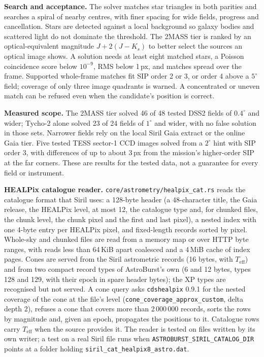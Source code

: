 \documentclass[11pt,a4paper]{article}
\newcommand{\code}[1]{\texttt{\small #1}}
\newcommand{\crate}[1]{\texttt{#1}}
\begin{document}
    \textbf{Search and acceptance.} The solver matches star triangles in both parities and searches a spiral of nearby centres, with finer spacing for wide fields, progress and cancellation. Stars are detected against a local background so galaxy bodies and scattered light do not dominate the threshold. The 2MASS tier is ranked by an optical-equivalent magnitude $J + 2(J-K_s)$ to better select the sources an optical image shows. A solution needs at least eight matched stars, a Poisson coincidence score below $10^{-9}$, RMS below 1\,px, and matches spread over the frame. Supported whole-frame matches fit SIP order 2 or 3, or order 4 above a $5^{\circ}$ field; coverage of only three image quadrants is warned. A concentrated or uneven match can be refused even when the candidate's position is correct.

    \textbf{Measured scope.} The 2MASS tier solved 46 of 48 tested DSS2 fields of $0.4^{\circ}$ and wider; Tycho-2 alone solved 23 of 24 fields of $1^{\circ}$ and wider, with no false solution in those sets. Narrower fields rely on the local Siril Gaia extract or the online Gaia tier. Five tested TESS sector-1 CCD images solved from a $2^{\circ}$ hint with SIP order 3, with differences of up to about 3\,px from the mission's higher-order SIP at the far corners. These are results for the tested data, not a guarantee for every field or instrument.

    \textbf{HEALPix catalogue reader.} \code{core/astrometry/healpix\_cat.rs} reads the catalogue format that Siril uses: a 128-byte header (a 48-character title, the Gaia release, the HEALPix level, at most 12, the catalogue type and, for chunked files, the chunk level, the chunk pixel and the first and last pixel), a nested index with one 4-byte entry per HEALPix pixel, and fixed-length records sorted by pixel. Whole-sky and chunked files are read from a memory map or over HTTP byte ranges, with reads less than 64\,KiB apart coalesced and a 4\,MiB cache of index pages. Cones are served from the Siril astrometric records (16 bytes, with $T_{\text{eff}}$) and from two compact record types of AstroBurst's own (6 and 12 bytes, types 128 and 129, with their epoch in spare header bytes); the XP types are recognised but not served. A cone query asks \crate{cdshealpix} 0.9.1 for the nested coverage of the cone at the file's level (\code{cone\_coverage\_approx\_custom}, delta depth 2), refuses a cone that covers more than 2\,000\,000 records, sorts the rows by magnitude and, given an epoch, propagates the positions to it. Catalogue rows carry $T_{\text{eff}}$ when the source provides it. The reader is tested on files written by its own writer; a test on a real Siril file runs when \code{ASTROBURST\_SIRIL\_CATALOG\_DIR} points at a folder holding \code{siril\_cat\_healpix8\_astro.dat}.
\end{document}
